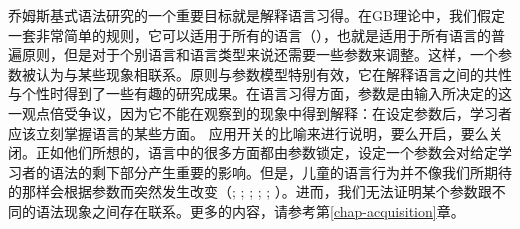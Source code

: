 乔姆斯基式语法研究的一个重要目标就是解释语言习得。在GB理论中，我们假定一套非常简单的规则，它可以适用于所有的语言（\xbartc），也就是适用于所有语言的普遍原则，但是对于个别语言和语言类型来说还需要一些参数来调整。这样，一个参数被认为与某些现象相联系。原则与参数模型特别有效，它在解释语言之间的共性与个性时得到了一些有趣的研究成果。在语言习得方面，参数是由输入所决定的这一观点倍受争议，因为它不能在观察到的现象中得到解释：在设定参数后，学习者应该立刻掌握语言的某些方面。 \citet[]{Chomsky86}应用开关的比喻来进行说明，要么开启，要么关闭。正如他们所想的，语言中的很多方面都由参数锁定，设定一个参数会对给定学习者的语法的剩下部分产生重要的影响。但是，儿童的语言行为并不像我们所期待的那样会根据参数而突然发生改变（\citealp[]{Bloom93a}; \citealp[]{Haider93a}; \citealp[]{Abney96a};
\citealp[Section~9.1]{AW98a}; \citealp{Tomasello2000a,Tomasello2003a};
\citealp{Newmeyer2005a}）。进而，我们无法证明某个参数跟不同的语法现象之间存在联系。更多的内容，请参考第\ref{chap-acquisition}章。

